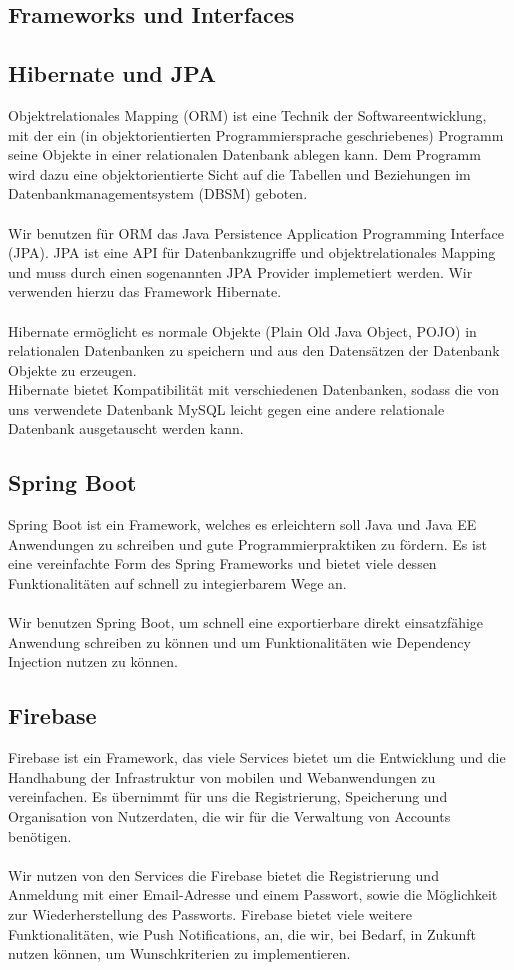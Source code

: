 \documentclass[a4paper]{scrreprt}
\begin{document}
\subsection{Frameworks und Interfaces}
\subsection*{Hibernate und JPA}

Objektrelationales Mapping (ORM) ist eine Technik der Softwareentwicklung, mit der ein (in objektorientierten Programmiersprache geschriebenes) Programm seine Objekte in einer relationalen Datenbank ablegen kann. Dem Programm wird dazu eine objektorientierte Sicht auf die Tabellen und Beziehungen im \Gls{Datenbankmanagementsystem} (DBSM) geboten. \\  \\ Wir benutzen für ORM das Java Persistence Application Programming Interface (JPA). 
JPA ist eine API für Datenbankzugriffe und objektrelationales Mapping und muss durch einen sogenannten JPA Provider implemetiert werden. Wir verwenden hierzu das \Gls{Framework} Hibernate.\\ \\ Hibernate ermöglicht es normale Objekte (Plain Old Java Object, \Gls{POJO}) in relationalen Datenbanken zu speichern und aus den Datensätzen der Datenbank Objekte zu erzeugen. \\
Hibernate bietet Kompatibilität mit verschiedenen Datenbanken, sodass die von uns verwendete Datenbank MySQL leicht gegen eine andere relationale Datenbank ausgetauscht werden kann.

\subsection*{Spring Boot}

Spring Boot ist ein Framework, welches es erleichtern soll Java und Java EE Anwendungen zu schreiben und gute Programmierpraktiken zu fördern. Es ist eine vereinfachte Form des Spring Frameworks und bietet viele dessen Funktionalitäten auf schnell zu integierbarem Wege an. \\ \\
Wir benutzen Spring Boot, um schnell eine exportierbare direkt einsatzfähige Anwendung schreiben zu können und um Funktionalitäten wie \Gls{Dependency Injection} nutzen zu können.

\subsection*{Firebase}
Firebase ist ein Framework, das viele Services bietet um die Entwicklung und die Handhabung der Infrastruktur von mobilen und Webanwendungen zu vereinfachen. Es übernimmt für uns die Registrierung, Speicherung und Organisation von Nutzerdaten, die wir für die Verwaltung von Accounts benötigen. \\ \\
Wir nutzen von den Services die Firebase bietet die Registrierung und Anmeldung mit einer Email-Adresse und einem Passwort, sowie die Möglichkeit zur Wiederherstellung des Passworts. Firebase bietet viele weitere Funktionalitäten, wie Push Notifications, an, die wir, bei Bedarf, in Zukunft nutzen können, um Wunschkriterien zu implementieren.
\end{document}
